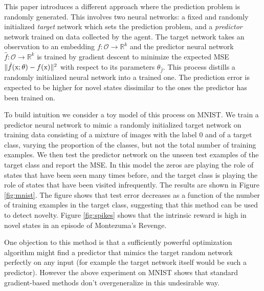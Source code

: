 \documentclass{article} %
\begin{document}
\label{sec:rnd}


This paper introduces a different approach where the prediction problem is randomly generated. This involves two neural networks: a fixed and randomly initialized \emph{target} network which sets the prediction problem, and a \emph{predictor} network trained on data collected by the agent. The target network takes an observation to an embedding $f: \mathcal{O} \to \mathbb{R}^k$ and the predictor neural network $\hat{f}: \mathcal{O} \to \mathbb{R}^k$ is trained by gradient descent to minimize the expected MSE $\Vert \hat{f}({\textnormal{x}}; \theta) - f({\textnormal{x}}) \Vert^2$ with respect to its parameters $\theta_{\hat{f}}$. This process distills a randomly initialized neural network into a trained one. The prediction error is expected to be higher for novel states dissimilar to the ones the predictor has been trained on.

To build intuition we consider a toy model of this process on MNIST. We train a predictor neural network to mimic a randomly initialized target network on training data consisting of a mixture of images with the label 0 and of a target class, varying the proportion of the classes, but not the total number of training examples. We then test the predictor network on the unseen test examples of the target class and report the MSE. In this model the zeros are playing the role of states that have been seen many times before, and the target class is playing the role of states that have been visited infrequently. The results are shown in Figure \ref{fig:mnist}. The figure shows that test error decreases as a function of the number of training examples in the target class, suggesting that this method can be used to detect novelty. Figure \ref{fig:spikes} shows that the intrinsic reward is high in novel states in an episode of Montezuma's Revenge.

One objection to this method is that a sufficiently powerful optimization algorithm might find a predictor that mimics the target random network perfectly on any input (for example the target network itself would be such a predictor). However the above experiment on MNIST shows that standard gradient-based methods don't overgeneralize in this undesirable way.
\end{document}
